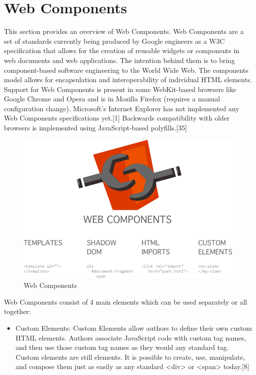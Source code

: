 \section{Web Components}
\label{sec:web_components}
This section provides an overview of Web  Components.
Web Components are a set of standards currently being produced by Google engineers as a W3C specification that allows for the creation of reusable widgets or components in web documents and web  applications.  The intention behind them is to bring component-based software engineering to the World Wide Web. The components model allows for encapsulation and interoperability of individual HTML  elements.
\newline
Support for Web Components is present in some WebKit-based browsers like Google Chrome and Opera and is in Mozilla Firefox (requires a manual configuration change). Microsoft’s Internet Explorer has not implemented any Web Components specifications yet.[1] Backwards compatibility with older browsers is implemented using JavaScript-based polyfills.[35]
\begin{figure}[htb]
 \centering
 \includegraphics[width=1.0\linewidth]{images/chapter2/web_cmpts.png}\hfill
 \caption[Web Components]{Web Components}
 \label{fig:fourV}
\end{figure}
Web Components consist of 4 main elements which can be used separately or all together:
\begin{itemize}
\item Custom Elements: Custom Elements allow authors to define their own custom HTML elements. Authors associate JavaScript code with custom tag names, and then use those custom tag names as they would any standard tag.  Custom elements are still elements.  It is possible to create, use,
manipulate, and compose them just as easily as any standard <div> or <span> today.[8]
\end{itemize}
